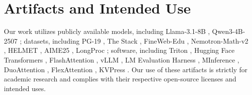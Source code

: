 \section{Artifacts and Intended Use}

Our work utilizes publicly available models, including Llama-3.1-8B \cite{llama3}, Qwen3-4B-2507 \cite{qwen3}; datasets, including PG-19 \cite{pg19}, The Stack \cite{thestack}, FineWeb-Edu \cite{fineweb}, Nemotron-Math-v2 \cite{nemotronmath}, HELMET \cite{helmet}, AIME25 \cite{aime25}, LongProc \cite{longproc}; software, including Triton \cite{triton}, Hugging Face Transformers \cite{transformers}, FlashAttention \cite{flashattn}, vLLM \cite{pagedattn}, LM Evaluation Harness \cite{lmeval}, MInference \cite{minference}, DuoAttention \cite{duoattn}, FlexAttention \cite{flexattn}, KVPress \cite{expectedattn}. Our use of these artifacts is strictly for academic research and complies with their respective open-source licenses and intended uses.